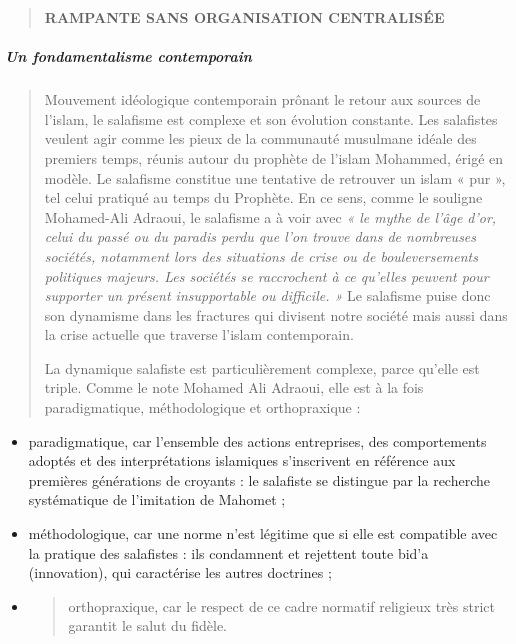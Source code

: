 \begin{quote}
\textbf{RAMPANTE SANS ORGANISATION CENTRALISÉE}
\end{quote}

\hypertarget{un-fondamentalisme-contemporain}{%
\subparagraph{Un fondamentalisme
contemporain}\label{un-fondamentalisme-contemporain}}

\begin{quote}
Mouvement idéologique contemporain prônant le retour aux sources de
l'islam, le salafisme est complexe et son évolution constante. Les
salafistes veulent agir comme les pieux de la communauté musulmane
idéale des premiers temps, réunis autour du prophète de l'islam
Mohammed, érigé en modèle. Le salafisme constitue une tentative de
retrouver un islam « pur », tel celui pratiqué au temps du Prophète. En
ce sens, comme le souligne Mohamed-Ali Adraoui, le salafisme a à voir
avec \emph{« le mythe de l'âge d'or, celui du passé ou du paradis perdu
que l'on trouve dans de nombreuses sociétés, notamment lors des
situations de crise ou de bouleversements politiques majeurs. Les
sociétés se raccrochent à ce qu'elles peuvent pour supporter un présent
insupportable ou difficile. »} Le salafisme puise donc son dynamisme
dans les fractures qui divisent notre société mais aussi dans la crise
actuelle que traverse l'islam contemporain.

La dynamique salafiste est particulièrement complexe, parce qu'elle est
triple. Comme le note Mohamed Ali Adraoui, elle est à la fois
paradigmatique, méthodologique et orthopraxique :
\end{quote}

\begin{itemize}
\item
  paradigmatique, car l'ensemble des actions entreprises, des
  comportements adoptés et des interprétations islamiques s'inscrivent
  en référence aux premières générations de croyants : le salafiste se
  distingue par la recherche systématique de l'imitation de Mahomet ;
\item
  méthodologique, car une norme n'est légitime que si elle est
  compatible avec la pratique des salafistes : ils condamnent et
  rejettent toute bid'a (innovation), qui caractérise les autres
  doctrines ;
\item
  \begin{quote}
  orthopraxique, car le respect de ce cadre normatif religieux très
  strict garantit le salut du fidèle.
  \end{quote}
\end{itemize}

